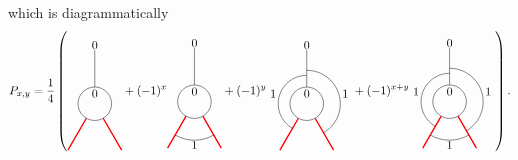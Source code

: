 which is diagrammatically
	\begin{equation}
		P_{x,y}=\frac{1}{4}\left(
			\begin{tikzpicture}[scale=1,baseline=(current bounding box.center)]
			\draw (0,0) circle (0.5cm);
			\draw[red,line width=0.4mm]
			\foreach \a in {-60, -120} {
				(\a:0.5) -- (\a:1.6)
			};
			\draw[] (90:0.5) -- (90:1.6);
			\node at (90:.3cm){$0$};\node at (90:1.75cm){$0$};
			\end{tikzpicture}
			+(-1)^x
			\begin{tikzpicture}[scale=1,baseline=(current bounding box.center)]
			\draw (0,0) circle (0.5cm);
			\draw[red,line width=0.4mm]
			\foreach \a in {-60, -120} {
				(\a:0.5) -- (\a:1.6)
			};
			\draw ([shift=(-120:1.15cm)]0,0) arc (-120:-60:1.15cm);
			\draw[] (90:0.5) -- (90:1.6);
			\node at (90:.3cm){$0$};\node at (90:1.75cm){$0$};
						\node at (0,-1.3) {$1$};
			\end{tikzpicture}
			+(-1)^y
			\begin{tikzpicture}[scale=1,baseline=(current bounding box.center)]
			\draw (0,0) circle (0.5cm);
			\draw[red,line width=0.4mm]
			\foreach \a in {-60, -120} {
				(\a:0.5) -- (\a:1.6)
			};
									\draw ([shift=(-60:1cm)]0,0) arc (-60:90:1cm);
									\draw ([shift=(240:0.85cm)]0,0) arc (240:90:0.85cm);
			\draw[] (90:0.5) -- (90:1.6);
			\node at (90:.3cm){$0$};\node at (90:1.75cm){$0$};
						\node at (-1,0.3) {$1$};
									\node at (1.15,0.3) {$1$};
			\end{tikzpicture}
			+(-1)^{x+y}
			\begin{tikzpicture}[scale=1,baseline=(current bounding box.center)]
			\draw (0,0) circle (0.5cm);
			\draw[red,line width=0.4mm]
			\foreach \a in {-60, -120} {
				(\a:0.5) -- (\a:1.6)
			};
									\draw ([shift=(-60:1cm)]0,0) arc (-60:90:1cm);
			\draw ([shift=(-120:1.15cm)]0,0) arc (-120:-60:1.15cm);
									\draw ([shift=(240:0.85cm)]0,0) arc (240:90:0.85cm);
			\draw[] (90:0.5) -- (90:1.6);
			\node at (90:.3cm){$0$};\node at (90:1.75cm){$0$};
			\node at (-1,0.3) {$1$};
			\node at (1.15,0.3) {$1$};
			\node at (0,-1.3) {$1$};
			\end{tikzpicture}
			\right).
	\end{equation}
	
